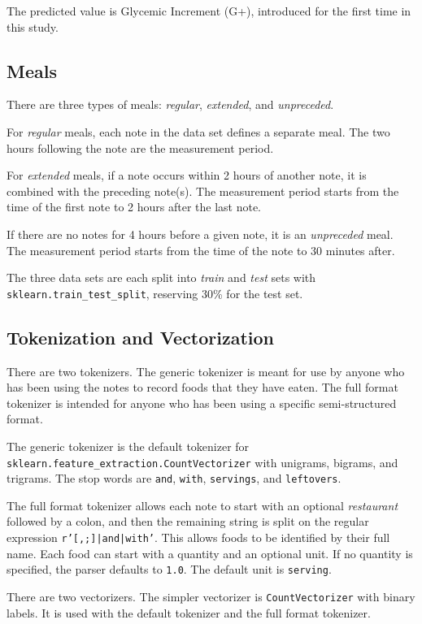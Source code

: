 \documentclass[conference]{IEEEtran}
\begin{document}
The predicted value is Glycemic Increment (G+), introduced for the first time in this study.

\subsection{Meals}

There are three types of meals: \emph{regular}, \emph{extended}, and \emph{unpreceded}.

For \emph{regular} meals, each note in the data set defines a separate meal. The two hours following the note are the measurement period.

For \emph{extended} meals, if a note occurs within 2 hours of another note, it is combined with the preceding note(s). The measurement period starts from the time of the first note to 2 hours after the last note.

If there are no notes for 4 hours before a given note, it is an \emph{unpreceded} meal. The measurement period starts from the time of the note to 30 minutes after.

The three data sets are each split into \emph{train} and \emph{test} sets with \texttt{sklearn.train\_test\_split}, reserving 30\% for the test set.

\subsection{Tokenization and Vectorization}

There are two tokenizers. The generic tokenizer is meant for use by anyone who has been using the notes to record foods that they have eaten. The full format tokenizer is intended for anyone who has been using a specific semi-structured format.

The generic tokenizer is the default tokenizer for \texttt{sklearn.feature\_extraction.CountVectorizer} with unigrams, bigrams, and trigrams. The stop words are \texttt{and}, \texttt{with}, \texttt{servings}, and \texttt{leftovers}.

The full format tokenizer allows each note to start with an optional \emph{restaurant} followed by a colon, and then the remaining string is split on the regular expression \texttt{r'[,;]|and|with'}. This allows foods to be identified by their full name. Each food can start with a quantity and an optional unit. If no quantity is specified, the parser defaults to \texttt{1.0}. The default unit is \texttt{serving}.

There are two vectorizers. The simpler vectorizer is \texttt{CountVectorizer} with binary labels. It is used with the default tokenizer and the full format tokenizer.
\end{document}
